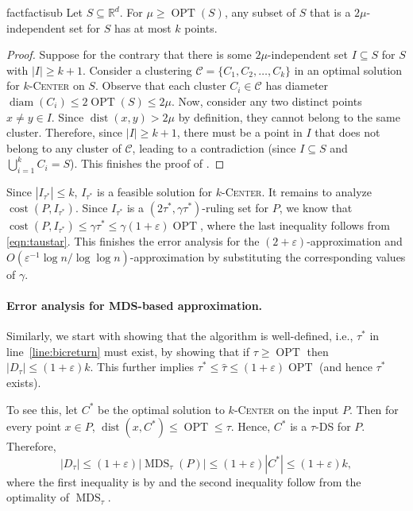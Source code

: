 \documentclass[11pt,letterpaper]{article}
\theoremstyle{plain}
\theoremstyle{definition}
\theoremstyle{remark}
\newcommand{\ProblemName}[1]{\textsc{#1}}
\newcommand{\kCenter}{$k$-\ProblemName{Center}\xspace}
\def\RR{{\mathbb{R}}}
\DeclareMathOperator{\cost}{cost}
\DeclareMathOperator{\OPT}{OPT}
\DeclareMathOperator{\dist}{dist}
\DeclareMathOperator{\diam}{diam}
\DeclareMathOperator{\MDS}{MDS}
\newcommand{\IS}{\ensuremath{I}\xspace}
\renewcommand{\epsilon}{\ensuremath{\varepsilon}}
\let\epsilon\varepsilon
\begin{document}
\begin{restatable}{fact}{factisub}
\label{fact:is_ub}
Let $S \subseteq \RR^d$. For $\mu \geq \OPT(S)$, any subset of $S$ that is a $2\mu$-independent set for $S$ has at most $k$ points. 
\end{restatable}
\begin{proof}
Suppose for the contrary that there is some $2\mu$-independent set $\IS \subseteq S$ for $S$ with $|\IS| \ge k + 1$.
Consider a clustering $\mathcal{C} = \{C_1, C_2, \dots, C_k\}$ in an optimal solution for \kCenter on $S$.
Observe that each cluster $C_i \in \mathcal{C}$ has diameter $\diam(C_i) \leq 2\OPT(S) \leq 2 \mu$.
Now, consider any two distinct points $x \neq y \in \IS$. Since $\dist(x, y) > 2\mu$ by definition,
they cannot belong to the same cluster. Therefore, since $|\IS| \ge k+1$, there must be a point in \IS that does not belong to any cluster of $\mathcal{C}$, leading to a contradiction (since $\IS \subseteq S$ and $\bigcup_{i=1}^k C_i = S$).
This finishes the proof of .
\end{proof}




Since $|I_{\tau^*}|\leq k$, $I_{\tau^*}$ is a feasible solution for \kCenter. 
It remains to analyze $\cost(P, I_{\tau^*})$. 
Since $I_{\tau^*}$ is a $(2\tau^{*}, \gamma\tau^{*})$-ruling set for $P$, we know that $\cost(P, I_{\tau^{*}})\leq \gamma\tau^{*}\leq \gamma(1+\varepsilon)\OPT$, where the last inequality follows from \eqref{eqn:taustar}.
This finishes the error analysis for the $(2 + \epsilon)$-approximation and $O(\epsilon^{-1}\log n/ \log \log n)$-approximation by substituting the corresponding values of $\gamma$.   








\paragraph{Error analysis for MDS-based approximation.}
Similarly, we start with showing that the algorithm is well-defined, i.e., $\tau^*$ in line~\ref{line:bicreturn} must exist,
by showing that if $\tau \geq \OPT$ then $|D_\tau| \leq (1 + \epsilon) k$.
This further implies $\tau^* \leq \hat{\tau} \leq (1 + \epsilon) \OPT$ (and hence $\tau^*$ exists). 

To see this, let $C^*$ be the optimal solution to \kCenter on the input $P$. 
Then for every point $x\in P$, $\dist(x, C^*)\leq \OPT \leq \tau$.
Hence, $C^*$ is a $\tau$-DS for $P$. 
Therefore, 
\begin{equation*}
    |D_{\tau}|\leq (1+\varepsilon)|\MDS_{\tau}(P)|\leq (1+\varepsilon)|C^*|\leq (1+\varepsilon)k,
\end{equation*} 
where the first inequality is by  and the second inequality follow from the optimality of $\MDS_\tau$. 
\end{document}
